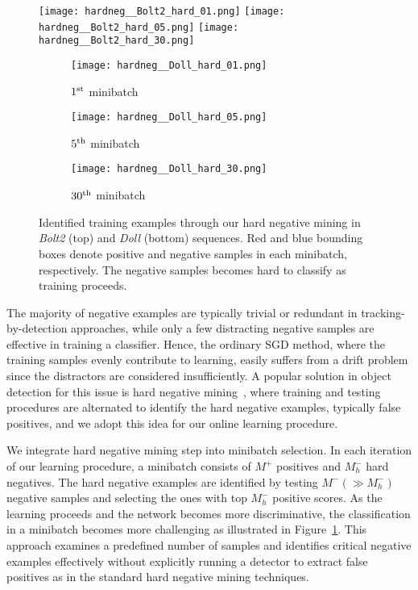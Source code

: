 \documentclass[10pt,twocolumn,letterpaper]{article}
\begin{document}
\begin{figure}[t]
\begin{center}
\texttt{[image: hardneg\_\_Bolt2\_hard\_01.png]}
\texttt{[image: hardneg\_\_Bolt2\_hard\_05.png]}
\texttt{[image: hardneg\_\_Bolt2\_hard\_30.png]}

\begin{subfigure}[b]{0.32\linewidth}
\texttt{[image: hardneg\_\_Doll\_hard\_01.png]}
\vspace{-5mm}
\caption{$1^{\rm st}$ minibatch}
\end{subfigure}
\begin{subfigure}[b]{0.32\linewidth}
\texttt{[image: hardneg\_\_Doll\_hard\_05.png]}
\vspace{-5mm}
\caption{$5^{\rm th}$ minibatch}
\end{subfigure}
\begin{subfigure}[b]{0.32\linewidth}
\texttt{[image: hardneg\_\_Doll\_hard\_30.png]}
\vspace{-5mm}
\caption{$30^{\rm th}$ minibatch}
\end{subfigure}
\end{center}
\vspace{-5mm}
\caption{Identified training examples through our hard negative mining in \emph{Bolt2} (top) and \emph{Doll} (bottom) sequences. Red and blue bounding boxes denote positive and negative samples in each minibatch, respectively. The negative samples becomes hard to classify as training proceeds.}
\label{fig:hbm}
\end{figure}

The majority of negative examples are typically trivial or redundant in tracking-by-detection approaches, while only a few distracting negative samples are effective in training a classifier. 
Hence, the ordinary SGD method, where the training samples evenly contribute to learning, easily suffers from a drift problem since the distractors are considered insufficiently. 
A popular solution in object detection for this issue is hard negative mining~\cite{655648}, where training and testing procedures are alternated to identify the hard negative examples, typically false positives, and we adopt this idea for our online learning procedure.

We integrate hard negative mining step into minibatch selection. 
In each iteration of our learning procedure, a minibatch consists of $M^+$ positives and $M_h^-$ hard negatives. 
The hard negative examples are identified by testing $M^- (\gg M_h^-)$ negative samples and selecting the ones with top $M_h^-$ positive scores. 
As the learning proceeds and the network becomes more discriminative, the classification in a minibatch becomes more challenging as illustrated in Figure~\ref{fig:hbm}. 
This approach examines a predefined number of samples and identifies critical negative examples effectively without explicitly running a detector to extract false positives as in the standard hard negative mining techniques.
\end{document}
